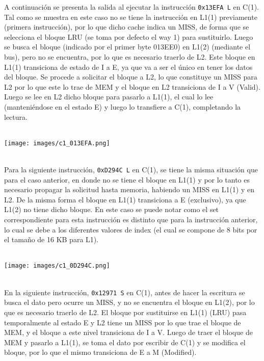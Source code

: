 \documentclass {article}
\begin{document}
A continuación se presenta la salida al ejecutar la instrucción \texttt{0x13EFA L} en C(1). Tal como
se muestra en este caso no se tiene la instrucción en L1(1) previamente (primera instrucción), por
lo que dicho cache indica un MISS, de forma que se selecciona el bloque LRU (se toma por defecto el
way 1) para sustituirlo. Luego se busca el bloque (indicado por el primer byte 013EE0) en L1(2)
(mediante el bus), pero no se encuentra, por lo que es necesario traerlo de L2. Este bloque en L1(1)
transiciona de estado de I a E, ya que va a ser el único en tener los datos del bloque. Se procede a
solicitar el bloque a L2, lo que constituye un MISS para L2 por lo que este lo trae de MEM y el
bloque en L2 transiciona de I a V (Valid). Luego se lee en L2 dicho bloque para pasarlo a L1(1), el
cual lo lee (manteniéndose en el estado E) y luego lo transfiere a C(1), completando la lectura.
\\
\\
\begin{centering} \texttt{[image: images/c1\_013EFA.png]} \end{centering}
\\
Para la siguiente instrucción, \texttt{0xD294C L} en C(1), se tiene la misma situación que para el caso
anterior, en donde no se tiene el bloque en L1(1) y por lo tanto es necesario propagar la solicitud
hasta memoria, habiendo un MISS en L1(1) y en L2. De la misma forma el bloque en L1(1) transiciona a
E (exclusivo), ya que L1(2) no tiene dicho bloque. En este caso se puede notar como el set
correspondiente para esta instrucción es distinto que para la instrucción anterior, lo cual se debe
a los diferentes valores de index (el cual se compone de 8 bits por el tamaño de 16 KB para L1).
\\
\\
\begin{centering} \texttt{[image: images/c1\_0D294C.png]} \end{centering}
\\
En la siguiente instrucción, \texttt{0x12971 S} en C(1), antes de hacer la escritura se busca el dato pero
ocurre un MISS, y no se encuentra el bloque en L1(2), por lo que es necesario traerlo de L2. El
bloque por sustituirse en L1(1) (LRU) pasa temporalmente al estado E y L2 tiene un MISS por lo que
trae el bloque de MEM, y el bloque a este nivel transiciona de I a V. Luego de traer el bloque de
MEM y pasarlo a L1(1), se toma el dato por escribir de C(1) y se modifica el bloque, por lo que el
mismo transiciona de E a M (Modified). 
\end{document}
